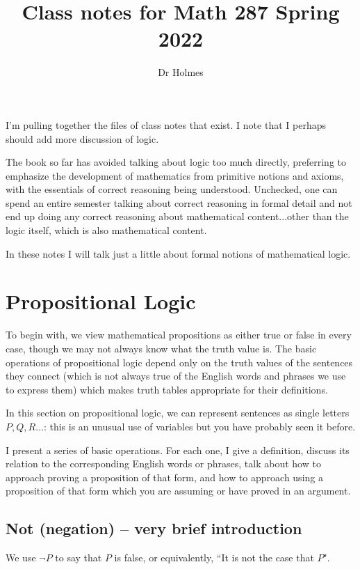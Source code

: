 \documentclass[12pt]{article}
\title{Class notes for Math 287 Spring 2022}
\author{Dr Holmes}
\begin{document}
\maketitle

I'm pulling together the files of class notes that exist.  I note that I perhaps should add more discussion of logic.

\tableofcontents

\newpage

The book so far has avoided talking about logic too much directly, preferring to emphasize the development of mathematics from primitive notions and axioms, with the essentials of correct reasoning being understood.  Unchecked, one can spend an entire semester talking about correct reasoning in formal detail and not end up doing any correct reasoning about mathematical content...other than the logic itself, which is also mathematical content.

In these notes I will talk just a little about formal notions of mathematical logic.

\section{Propositional Logic}

To begin with, we view mathematical propositions as either true or false in every case, though we may not always know what the truth value is.  The basic operations of propositional logic depend only on the truth values of the sentences they connect (which is not always true of the English words and phrases we use to express them) which makes truth tables appropriate for their definitions.

In this section on propositional logic, we can represent sentences as single letters $P,Q,R\ldots$:  this is an unusual use of variables but you have probably seen it before.

I present a series of basic operations.  For each one, I give a definition, discuss its relation to the corresponding English words or phrases, talk about how to approach proving a proposition of that form, and how to approach using a proposition of that form which you are assuming or have proved in an argument.

\subsection{Not (negation) -- very brief introduction}

We use $\neg P$ to say that $P$ is false, or equivalently, ``It is not the case that $P$".
\end{document}

